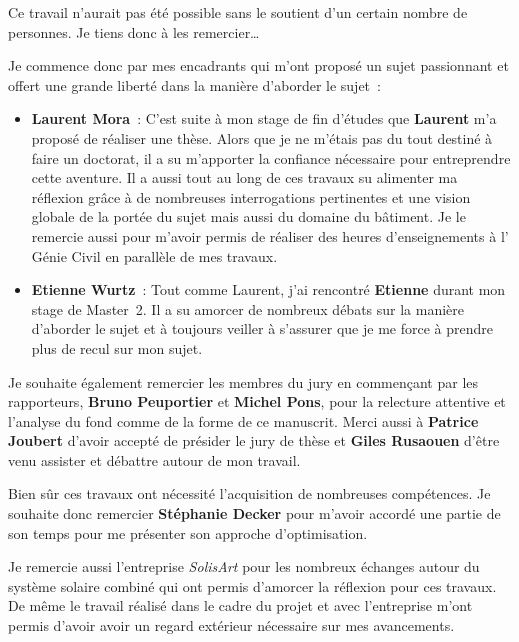
Ce travail n’aurait pas été possible sans le soutient d’un certain nombre de personnes.
Je tiens donc à les remercier\dots

Je commence donc par mes encadrants qui m’ont proposé un sujet passionnant et
offert une grande liberté dans la manière d’aborder le sujet~:
\begin{itemize}
  \item \textbf{Laurent Mora}~: C’est suite à mon stage de fin d’études que \textbf{Laurent} m’a proposé
        de réaliser une thèse. Alors que je ne m’étais pas du tout destiné à faire
        un doctorat, il a su m’apporter la confiance nécessaire pour entreprendre
        cette aventure.
        Il a aussi tout au long de ces travaux su alimenter ma réflexion grâce à de
        nombreuses interrogations pertinentes et une vision globale de la portée
        du sujet mais aussi du domaine du bâtiment.
        Je le remercie aussi pour m’avoir permis de réaliser des heures d’enseignements
        à l’ Génie Civil en parallèle de mes travaux.

  \item \textbf{Etienne Wurtz}~: Tout comme Laurent, j’ai rencontré \textbf{Etienne} durant mon stage
        de Master~2. Il a su amorcer de nombreux débats sur la manière d’aborder
        le sujet et à toujours veiller à s’assurer que je me force à prendre plus de
        recul sur mon sujet.
\end{itemize}


Je souhaite également remercier les membres du jury en commençant par les rapporteurs,
\textbf{Bruno Peuportier} et \textbf{Michel Pons}, pour la relecture attentive et l’analyse du fond comme
de la forme de ce manuscrit. Merci aussi à \textbf{Patrice Joubert} d’avoir accepté de présider
le jury de thèse et \textbf{Giles Rusaouen} d’être venu assister et débattre autour de mon travail.

Bien sûr ces travaux ont nécessité l’acquisition de nombreuses compétences. Je souhaite donc
remercier \textbf{Stéphanie Decker} pour m’avoir accordé une partie de son temps pour me présenter son
approche d’optimisation.

Je remercie aussi l’entreprise \emph{SolisArt} pour les nombreux échanges
autour du système solaire combiné qui ont permis d’amorcer la réflexion pour ces travaux.
De même le travail réalisé dans le cadre du projet  et avec l’entreprise  m’ont
permis d’avoir avoir un regard extérieur nécessaire sur mes avancements.


